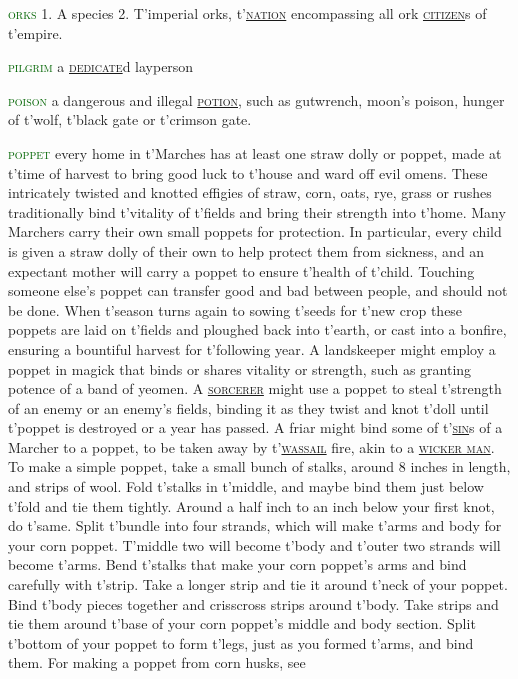 \documentclass[twoside,11pt,b5paper,twocolumn]{scrbook}
\newcommand{\estcab}[1]{\textsc{\textcolor{marron}{#1}}}
\renewcommand{\paragraph}[1]{\par\noindent\markboth{#1}{#1}\estcab{\textcolor{darkgreen}{#1}}\label{#1} }
\newcommand{\see}[1]{{\estcab{\hyperref[#1]{#1}}}}
\begin{document}
\paragraph{orks} 1. A species 2. T'imperial orks, t'\see{nation} encompassing all ork \see{citizen}s of t'empire.
\paragraph{pilgrim} a \see{dedicate}d layperson
\paragraph{poison} a dangerous and illegal \see{potion}, such as gutwrench, moon's poison, hunger of t'wolf, t'black gate or t'crimson gate.
\paragraph{poppet} every home in t'Marches has at least one straw dolly or poppet, made at t'time of harvest to bring good luck to t'house and ward off evil omens. These intricately twisted and knotted effigies of straw, corn, oats, rye, grass or rushes traditionally bind t'vitality of t'fields and bring their strength into t'home. Many Marchers carry their own small poppets for protection. In particular, every child is given a straw dolly of their own to help protect them from sickness, and an expectant mother will carry a poppet to ensure t'health of t'child. Touching someone else’s poppet can transfer good and bad between people, and should not be done. When t'season turns again to sowing t'seeds for t'new crop these poppets are laid on t'fields and ploughed back into t'earth, or cast into a bonfire, ensuring a bountiful harvest for t'following year. A landskeeper might employ a poppet in magick that binds or shares vitality or strength, such as granting potence of a band of yeomen. A \see{sorcerer} might use a poppet to steal t'strength of an enemy or an enemy's fields, binding it as they twist and knot t'doll until t'poppet is destroyed or a year has passed. A friar might bind some of t'\see{sin}s of a Marcher to a poppet, to be taken away by t'\see{wassail} fire, akin to a \see{wicker man}. To make a simple poppet, take a small bunch of stalks, around 8 inches in length, and strips of wool. Fold t'stalks in t'middle, and maybe bind them just below t'fold and tie them tightly. Around a half inch to an inch below your first knot, do t'same. Split t'bundle into four strands, which will make t'arms and body for your corn poppet. T'middle two will become t'body and t'outer two strands will become t'arms. Bend t'stalks that make your corn poppet’s arms and bind carefully with t'strip. Take a longer strip and tie it around t'neck of your poppet. Bind t'body pieces together and crisscross strips around t'body. Take strips and tie them around t'base of your corn poppet’s middle and body section. Split t'bottom of your poppet to form t'legs, just as you formed t'arms, and bind them. For making a poppet from corn husks, see 
\end{document}
